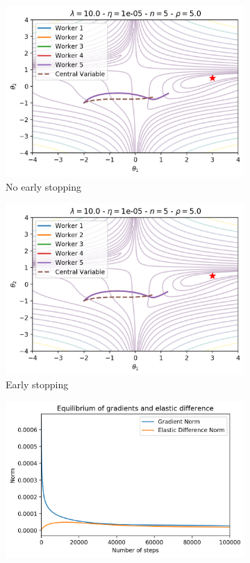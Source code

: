 \begin{figure}[H]
  \centering
  \begin{subfigure}{.45\textwidth}
    \centering
    \includegraphics[width=\linewidth]{resources/images/easgd_es_10_n}
    \caption{No early stopping}
  \end{subfigure}
  \begin{subfigure}{.45\textwidth}
    \centering
    \includegraphics[width=\linewidth]{resources/images/easgd_es_10_y}
    \caption{Early stopping}
  \end{subfigure}
  \begin{subfigure}{.45\textwidth}
    \centering
    \includegraphics[width=\linewidth]{resources/images/easgd_es_10_n_eq}

\end{subfigure}
\end{figure}
